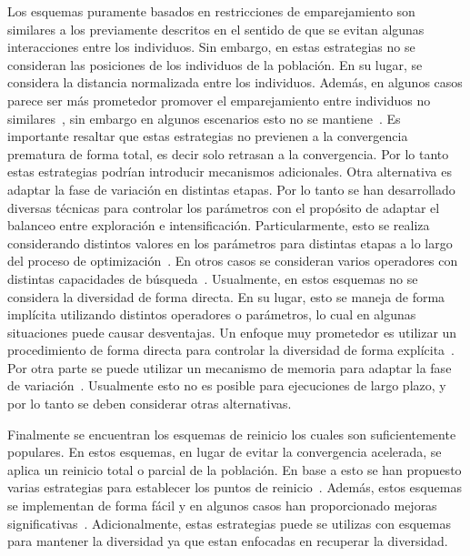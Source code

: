 Los esquemas puramente basados en restricciones de emparejamiento son similares a los previamente descritos en el sentido de que se evitan algunas interacciones entre los individuos.
%
Sin embargo, en estas estrategias no se consideran las posiciones de los individuos de la población.
%
En su lugar, se considera la distancia normalizada entre los individuos.
%
Además, en algunos casos parece ser más prometedor promover el emparejamiento entre individuos no similares~\cite{Joel:CHC}, sin embargo en algunos escenarios esto no se mantiene~\cite{deb1989investigation}.
%
Es importante resaltar que estas estrategias no previenen a la convergencia prematura de forma total, es decir solo retrasan a la convergencia.
%
Por lo tanto estas estrategias podrían introducir mecanismos adicionales.
%
Otra alternativa es adaptar la fase de variación en distintas etapas.
%
Por lo tanto se han desarrollado diversas técnicas para controlar los parámetros con el propósito de adaptar el balanceo entre exploración e intensificación.
%
Particularmente, esto se realiza considerando distintos valores en los parámetros para distintas etapas a lo largo del proceso de optimización~\cite{yu2014differential}.
%
En otros casos se consideran varios operadores con distintas capacidades de búsqueda~\cite{lobo2007parameter}.
%
Usualmente, en estos esquemas no se considera la diversidad de forma directa.
%
En su lugar, esto se maneja de forma implícita utilizando distintos operadores o parámetros, lo cual en algunas situaciones puede causar desventajas.
%
Un enfoque muy prometedor es utilizar un procedimiento de forma directa para controlar la diversidad de forma explícita~\cite{segredo2014fuzzy, lobo2007parameter}.
%
Por otra parte se puede utilizar un mecanismo de memoria para adaptar la fase de variación~\cite{yuen2009genetic}.
%
Usualmente esto no es posible para ejecuciones de largo plazo, y por lo tanto se deben considerar otras alternativas.
%

Finalmente se encuentran los esquemas de reinicio los cuales son suficientemente populares.
%
En estos esquemas, en lugar de evitar la convergencia acelerada, se aplica un reinicio total o parcial de la población.
%
En base a esto se han propuesto varias estrategias para establecer los puntos de reinicio~\cite{jansen2002analysis}.
%
Además, estos esquemas se implementan de forma fácil y en algunos casos han proporcionado mejoras significativas~\cite{koumousis2006saw}.
%
Adicionalmente, estas estrategias puede se utilizas con esquemas para mantener la diversidad ya que estan enfocadas en recuperar la diversidad.
%

